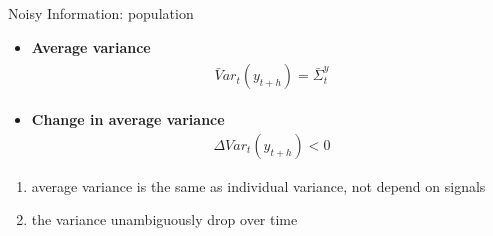 \documentclass{beamer}
\begin{document}
\begin{frame}{Noisy Information: population}
\begin{itemize}
\item \textbf{Average variance}
\begin{eqnarray*}
\begin{aligned}
\bar Var_t (y_{t+h}) = \bar \Sigma^y_t
\end{aligned}
\end{eqnarray*}
\item \textbf{Change in average variance}
\begin{eqnarray*}
\Delta Var_t(y_{t+h}) < 0 
\end{eqnarray*}

\end{itemize}

\begin{enumerate}
	\item average variance is the same as individual variance, not depend on signals
	\item the variance unambiguously drop over time 
\end{enumerate}

\end{frame}
\end{document}
